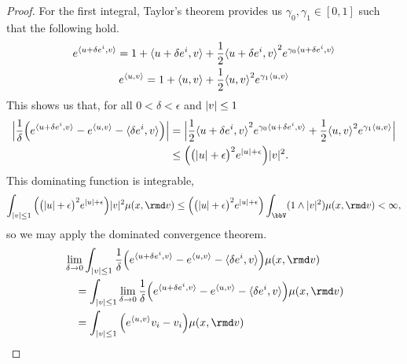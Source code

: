 \begin{proof}
  For the first integral, Taylor's theorem provides us $\gamma_0, \gamma_1 \in [0,1]$ such that the following hold.
  \begin{gather}
    e^{\langle u+\delta e^i , v \rangle} = 1 + {\langle u+\delta e^i , v \rangle} + \frac12 {\langle u+\delta e^i , v \rangle}^2 e^{\gamma_0{\langle u+\delta e^i , v \rangle}} \\
    e^{\langle u , v \rangle} = 1 + {\langle u , v \rangle} + \frac12 {\langle u , v \rangle}^2 e^{\gamma_1{\langle u , v \rangle}}
  \end{gather}
  This shows us that, for all $0 < \delta < \epsilon$ and $|v| \leq 1$
  \begin{align}
    \Big| \frac1\delta \Big( e^{\langle u+\delta e^i , v \rangle} - e^{\langle u , v \rangle} - {\langle \delta e^i , v \rangle} \Big) \Big|
    &= \Big| \frac{1}{2} {\langle u+\delta e^i , v \rangle}^2 e^{\gamma_0{\langle u+\delta e^i , v \rangle}} + \frac12{\langle u , v \rangle}^2 e^{\gamma_1{\langle u , v \rangle}} \Big| \\
    &\leq \Big(\big(|u| + \epsilon\big)^2 e^{|u|+\epsilon} \Big) |v|^2.
  \end{align}
  This dominating function is integrable,
  \begin{equation}
    \int_{|\markVar|\leq 1} \Big( \big(|\momentVar|+\epsilon\big)^2 e^{|\momentVar|+\epsilon} \Big) |\markVar|^2 \affJump(\stateVar,\rmd\markVar)
    \leq  \Big( \big(|\momentVar|+\epsilon\big)^2 e^{|\momentVar|+\epsilon} \Big) \int_\vecSpace (1 \wedge |\markVar|^2) \affJump(\stateVar,\rmd\markVar) < \infty,
  \end{equation}
  so we may apply the dominated convergence theorem.
  \begin{align}
    &\lim_{\delta \rightarrow 0} \int_{|\markVar|\leq 1} \frac1\delta \Big( e^\prj{\momentVar+\delta \basisVec^i}{\markVar} - e^\prj{\momentVar}{\markVar} - \prj{\delta \basisVec^i}{\markVar} \Big) \affJump(\stateVar,\rmd\markVar) \tag*{} \\
    &\quad= \int_{|\markVar|\leq 1} \lim_{\delta\rightarrow0} \frac{1}{\delta} \Big( e^\prj{\momentVar+\delta \basisVec^i}{\markVar} - e^\prj{\momentVar}{\markVar} - \prj{\delta \basisVec^i}{\markVar} \Big) \affJump(\stateVar,\rmd\markVar) \\
    \label{eq:dct1}
    &\quad= \int_{|\markVar|\leq1} \Big( e^\prj{\momentVar}{\markVar} \markVar_i - \markVar_i \Big) \affJump(\stateVar,\rmd\markVar)
  \end{align}


\end{proof}

